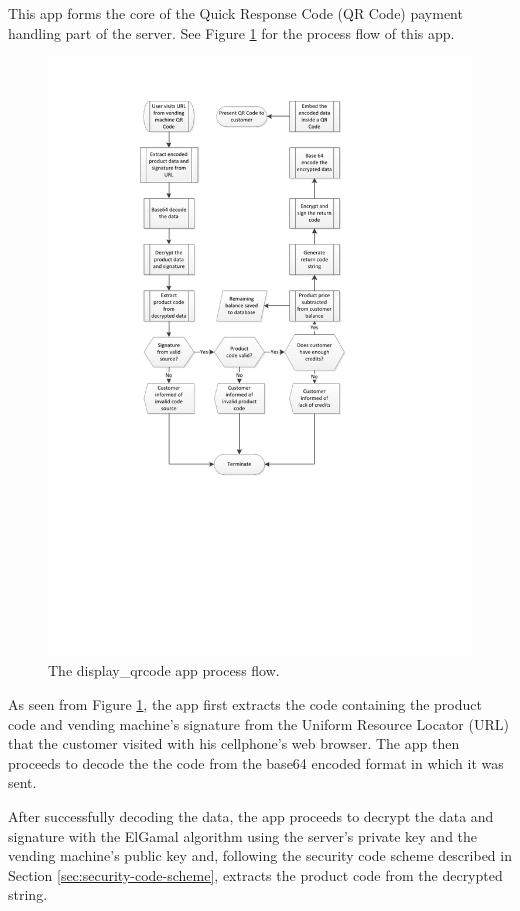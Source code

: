 This app forms the core of the Quick Response Code (QR Code) payment handling
part of the server. See Figure \ref{fig:disp-qrcode} for the process flow of
this app.

\begin{figure}
 \centering 
 \includegraphics[clip=true, trim = 0 250 0 50,
 scale=0.7]{qrcode_processflow_server_bak}
 \caption{The display\_qrcode app process flow.}
 \label{fig:disp-qrcode}
\end{figure}

As seen from Figure \ref{fig:disp-qrcode}, the app first extracts the code
containing the product code and vending machine's signature from the Uniform
Resource Locator (URL) that the customer visited with his cellphone's web
browser. The app then proceeds to decode the the code from the base64 encoded
format in which it was sent.

After successfully decoding the data, the app proceeds to decrypt the data and
signature with the ElGamal algorithm using the server's private key and the
vending machine's public key and, following the security code scheme described in Section
\ref{sec:security-code-scheme}, extracts the product code from the decrypted
string.


